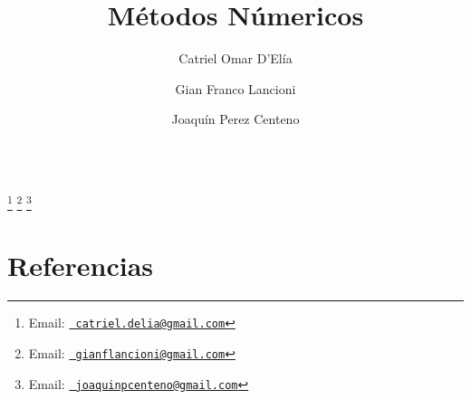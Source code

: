 \documentclass[11pt,spanish]{endm}
\begin{document}
\begin{verbatim}
\end{verbatim}\vspace{2.5cm}

\begin{frontmatter}

\title{Métodos Númericos}


\author{Catriel Omar D'Elía}
\author{Gian Franco Lancioni}
\author{Joaquín Perez Centeno}
\address{Depatamento de Computación\\ Universidad de Buenos Aires\\ Buenos Aires, Argentina}

\thanks[myemail]{Email:
   \href{catriel.delia@gmail.com} {\texttt{\normalshape
   catriel.delia@gmail.com}}} \thanks[myemail1]{Email:
   \href{gianflancioni@gmail.com} {\texttt{\normalshape
   gianflancioni@gmail.com}}} \thanks[myemail2]{Email:
   \href{joaquinpcenteno@gmail.com} {\texttt{\normalshape
   joaquinpcenteno@gmail.com}}}



\end{frontmatter}





\section{Referencias}



\end{document}
